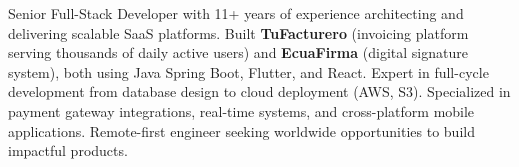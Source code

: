 
\begin{cvparagraph}

Senior Full-Stack Developer with 11+ years of experience architecting and delivering scalable SaaS platforms. Built \textbf{TuFacturero} (invoicing platform serving thousands of daily active users) and \textbf{EcuaFirma} (digital signature system), both using Java Spring Boot, Flutter, and React. Expert in full-cycle development from database design to cloud deployment (AWS, S3). Specialized in payment gateway integrations, real-time systems, and cross-platform mobile applications. Remote-first engineer seeking worldwide opportunities to build impactful products.
\end{cvparagraph}
